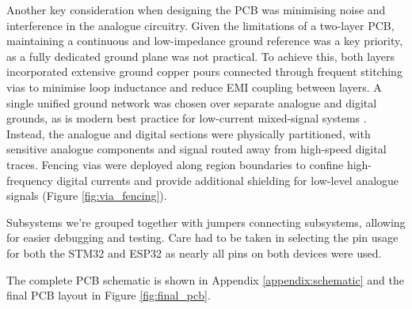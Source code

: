Another key consideration when designing the PCB was minimising noise and interference in the analogue circuitry. Given the limitations of a two-layer PCB, maintaining a continuous and low-impedance ground reference was a key priority, as a fully dedicated ground plane was not practical. To achieve this, both layers incorporated extensive ground copper pours connected through frequent stitching vias to minimise loop inductance and reduce \ac{EMI} coupling between layers. A single unified ground network was chosen over separate analogue and digital grounds, as is modern best practice for low-current mixed-signal systems \cite{WhatAreBasic}. Instead, the analogue and digital sections were physically partitioned, with sensitive analogue components and signal routed away from high-speed digital traces. Fencing vias were deployed along region boundaries to confine high-frequency digital currents and provide additional shielding for low-level analogue signals (Figure \ref{fig:via_fencing}).

Subsystems we're grouped together with jumpers connecting subsystems, allowing for easier debugging and testing. Care had to be taken in selecting the pin usage for both the STM32 and ESP32 as nearly all pins on both devices were used. 

The complete PCB schematic is shown in Appendix \ref{appendix:schematic} and the final PCB layout in Figure \ref{fig:final_pcb}.

